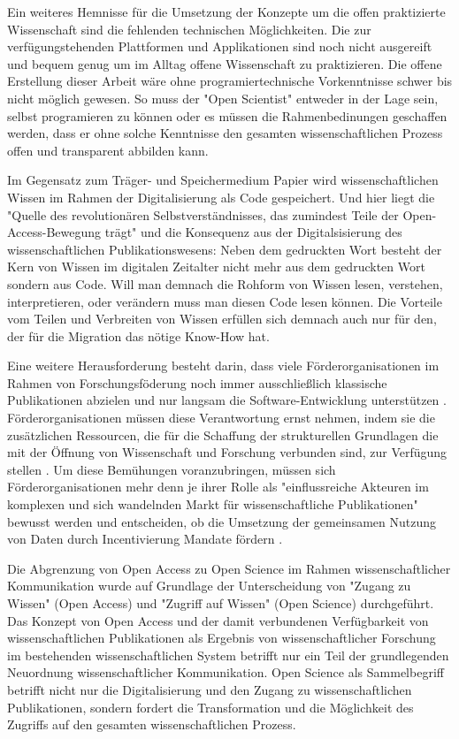 Ein weiteres Hemnisse für die Umsetzung der Konzepte um die offen praktizierte Wissenschaft sind die fehlenden technischen Möglichkeiten. Die zur verfügungstehenden Plattformen und Applikationen sind noch nicht ausgereift und bequem genug um im Alltag offene Wissenschaft zu praktizieren. Die offene Erstellung dieser Arbeit wäre ohne programiertechnische Vorkenntnisse schwer bis nicht möglich gewesen. So muss der "Open Scientist" entweder in der Lage sein, selbst programieren zu können oder es müssen die Rahmenbedinungen geschaffen werden, dass er ohne solche Kenntnisse den gesamten wissenschaftlichen Prozess offen und transparent abbilden kann.

Im Gegensatz zum Träger- und Speichermedium Papier wird wissenschaftlichen Wissen im Rahmen der Digitalisierung als Code gespeichert. Und hier liegt die "Quelle des revolutionären Selbstverständnisses, das zumindest Teile der Open-Access-Bewegung trägt" und die Konsequenz aus der Digitalsisierung des wissenschaftlichen Publikationswesens: Neben dem gedruckten Wort besteht der Kern von Wissen im digitalen Zeitalter nicht mehr aus dem gedruckten Wort sondern aus Code. Will man demnach die Rohform von Wissen lesen, verstehen, interpretieren, oder verändern muss man diesen Code lesen können. Die Vorteile vom Teilen und Verbreiten von Wissen erfüllen sich demnach auch nur für den, der für die Migration das nötige Know-How hat.

Eine weitere Herausforderung besteht darin, dass viele Förderorganisationen im Rahmen von Forschungsföderung noch immer ausschließlich klassische Publikationen abzielen und nur langsam die Software-Entwicklung unterstützen \cite{hey_2015_open}. Förderorganisationen müssen diese Verantwortung ernst nehmen, indem sie die zusätzlichen Ressourcen, die für die Schaffung der strukturellen Grundlagen die mit der Öffnung von Wissenschaft und Forschung verbunden sind, zur Verfügung stellen \cite{mennes_2013_making_os} \cite{patlak_2010_open}. Um diese Bemühungen voranzubringen, müssen sich Förderorganisationen mehr denn je ihrer Rolle als "einflussreiche  Akteuren  im  komplexen und  sich  wandelnden  Markt  für  wissenschaftliche  Publikationen" \cite{wein_2010_erwerbung} bewusst werden und entscheiden, ob die Umsetzung der gemeinsamen Nutzung von Daten durch Incentivierung Mandate fördern \cite{mennes_2013_making_os}.

Die Abgrenzung von Open Access zu Open Science im Rahmen wissenschaftlicher Kommunikation wurde auf Grundlage der Unterscheidung von "Zugang zu Wissen" (Open Access) und "Zugriff auf Wissen" (Open Science) durchgeführt. Das Konzept von Open Access und der damit verbundenen Verfügbarkeit von wissenschaftlichen Publikationen als Ergebnis von wissenschaftlicher Forschung im bestehenden wissenschaftlichen System betrifft nur ein Teil der grundlegenden Neuordnung wissenschaftlicher Kommunikation. Open Science als Sammelbegriff betrifft nicht nur die Digitalisierung und den Zugang zu wissenschaftlichen Publikationen, sondern fordert die Transformation und die Möglichkeit des Zugriffs auf den gesamten wissenschaftlichen Prozess.


